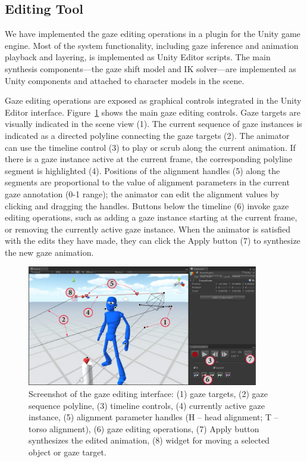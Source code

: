 \subsection{Editing Tool}

We have implemented the gaze editing operations in a plugin for the Unity game engine. Most of the system functionality, including gaze inference and animation playback and layering, is implemented as Unity Editor scripts. The main synthesis components---the gaze shift model and IK solver---are implemented as Unity components and attached to character models in the scene.

Gaze editing operations are exposed as graphical controls integrated in the Unity Editor interface. Figure~\ref{fig:GazeEditingTool} shows the main gaze editing controls. Gaze targets are visually indicated in the scene view (1). The current sequence of gaze instances is indicated as a directed polyline connecting the gaze targets (2).  The animator can use the timeline control (3) to play or scrub along the current animation. If there is a gaze instance active at the current frame, the corresponding polyline segment is highlighted (4). Positions of the alignment handles (5) along the segments are proportional to the value of alignment parameters in the current gaze annotation (0-1 range); the animator can edit the alignment values by clicking and dragging the handles. Buttons below the timeline (6) invoke gaze editing operations, such as adding a gaze instance starting at the current frame, or removing the currently active gaze instance. When the animator is satisfied with the edits they have made, they can click the Apply button (7) to synthesize the new gaze animation.

\begin{figure}
\centering
\includegraphics[width=0.9\textwidth]{gazeauthoring/Figures/GazeEditingTool.pdf}
\caption{Screenshot of the gaze editing interface: (1) gaze targets, (2) gaze sequence polyline, (3) timeline controls, (4) currently active gaze instance, (5) alignment parameter handles (H -- head alignment; T -- torso alignment), (6) gaze editing operations, (7) Apply button synthesizes the edited animation, (8) widget for moving a selected object or gaze target.}
\label{fig:GazeEditingTool}
\end{figure}

